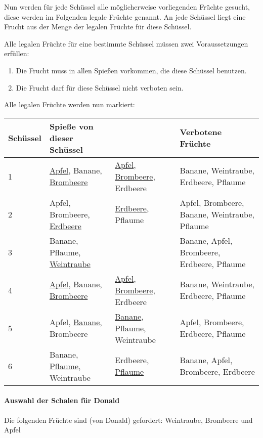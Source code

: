 \documentclass[a4paper,10pt,ngerman]{scrartcl}
\begin{document}
Nun werden für jede Schüssel alle möglicherweise vorliegenden Früchte gesucht, diese werden im Folgenden legale Früchte genannt.
An jede Schüssel liegt eine Frucht aus der Menge der legalen Früchte für diese Schüssel.

Alle legalen Früchte für eine bestimmte Schüssel müssen zwei Voraussetzungen erfüllen:
\begin{enumerate}
    \item Die Frucht muss in allen Spießen vorkommen, die diese Schüssel benutzen.
    \item Die Frucht darf für diese Schüssel nicht verboten sein.
\end{enumerate}
Alle legalen Früchte werden nun markiert:

\begin{center}
\begin{tabularx}{\linewidth}{l|X|X|X}
    \textbf{Schüssel} & \textbf{Spieße von dieser Schüssel} & & \textbf{Verbotene Früchte} \\
    \hline
    1 & \underline{Apfel}, Banane, \underline{Brombeere} & \underline{Apfel}, \underline{Brombeere}, Erdbeere & Banane, Weintraube, Erdbeere, Pflaume \\
    \hline
    2 & Apfel, Brombeere, \underline{Erdbeere} & \underline{Erdbeere}, Pflaume & Apfel, Brombeere, Banane, Weintraube, Pflaume \\
    \hline
    3 & Banane, Pflaume, \underline{Weintraube} & & Banane, Apfel, Brombeere, Erdbeere, Pflaume \\
    \hline
    4 & \underline{Apfel}, Banane, \underline{Brombeere} & \underline{Apfel}, \underline{Brombeere}, Erdbeere & Banane, Weintraube, Erdbeere, Pflaume \\
    \hline
    5 & Apfel, \underline{Banane}, Brombeere & \underline{Banane}, Pflaume, Weintraube & Apfel, Brombeere, Erdbeere, Pflaume \\
    \hline
    6 & Banane, \underline{Pflaume}, Weintraube & Erdbeere, \underline{Pflaume} & Banane, Apfel, Brombeere, Erdbeere
\end{tabularx}
\end{center}


\paragraph{Auswahl der Schalen für Donald}
Die folgenden Früchte sind (von Donald) gefordert: Weintraube, Brombeere und Apfel
\end{document}

